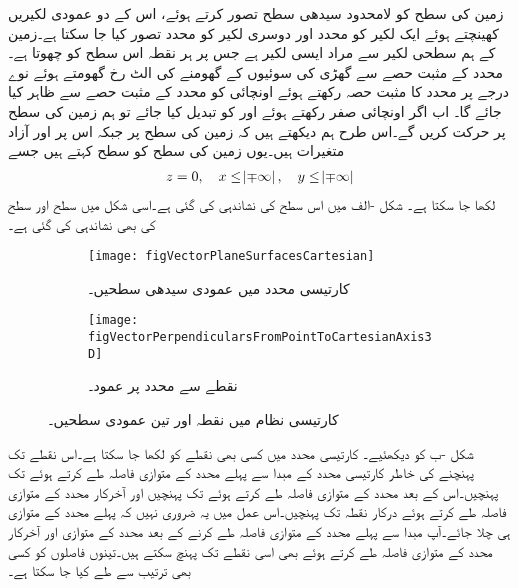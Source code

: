 زمین کی سطح کو لامحدود سیدھی سطح تصور کرتے ہوئے،  اس کے  دو عمودی لکیریں کھینچتے ہوئے ایک لکیر کو  محدد اور دوسری لکیر کو  محدد تصور کیا جا سکتا ہے۔زمین کے ہم سطحی لکیر سے مراد ایسی لکیر ہے جس پر ہر نقطہ اس سطح کو چھوتا ہے۔ محدد کے مثبت حصے  سے گھڑی کی سوئیوں کے گھومنے کی الٹ رخ گھومتے ہوئے نوے درجے پر  محدد کا مثبت حصہ رکھتے ہوئے اونچائی کو  محدد کے مثبت حصے  سے ظاہر کیا جائے گا۔ اب اگر اونچائی صفر رکھتے ہوئے  اور  کو تبدیل کیا جائے تو ہم زمین کی سطح پر حرکت کریں گے۔اس طرح ہم دیکھتے ہیں کہ زمین کی سطح پر  جبکہ اس پر  اور  آزاد متغیرات ہیں۔یوں زمین کی سطح کو  سطح کہتے ہیں جسے
\begin{align*}
z=0, \quad  x\le \abs{\mp \infty}, \quad y \le \abs{\mp \infty}
\end{align*} 
لکھا جا سکتا ہے۔  شکل -الف میں اس سطح کی نشاندہی کی گئی ہے۔اسی شکل میں  سطح اور  سطح کی بھی نشاندہی کی گئی ہے۔

\begin{figure}
\centering
\begin{subfigure}{0.5\textwidth}
\centering
\texttt{[image: figVectorPlaneSurfacesCartesian]}
\caption{کارتیسی محدد میں عمودی سیدھی سطحیں۔}
\label{شکل_سمتیہ_کارتیسی_عمودی-تین_سطحیں}
\end{subfigure}%
%
\begin{subfigure}{0.5\textwidth}
\centering
\texttt{[image: figVectorPerpendicularsFromPointToCartesianAxis3D]}
\caption{نقطے سے محدد پر عمود۔}
\label{شکل_سمتیہ_نقطے_سے_کارتیسی_محدد_پر_عمود}
\end{subfigure}%
\caption{کارتیسی نظام میں نقطہ اور تین عمودی سطحیں۔}
\label{شکل_سمتیہ_کارتیسی_نقطہ_اور_عمودی_سطحیں}
\end{figure}
شکل  -ب  کو دیکھئیے۔ کارتیسی محدد میں کسی بھی نقطے کو  لکھا جا سکتا ہے۔اس نقطے تک پہنچنے کی خاطر  کارتیسی محدد کے مبدا سے پہلے  محدد کے متوازی   فاصلہ طے کرتے ہوئے  تک پہنچیں۔اس کے بعد  محدد کے متوازی  فاصلہ طے کرتے ہوئے  تک پہنچیں  اور آخرکار  محدد کے متوازی  فاصلہ طے کرتے ہوئے درکار نقطہ  تک پہنچیں۔اس عمل میں یہ ضروری نہیں کہ پہلے  محدد کے متوازی ہی چلا جائے۔آپ مبدا سے پہلے  محدد کے متوازی  فاصلہ طے کرنے کے بعد  محدد کے متوازی  اور آخرکار  محدد کے متوازی  فاصلہ طے کرتے ہوئے بھی اسی نقطے تک پہنچ سکتے ہیں۔تینوں فاصلوں کو کسی بھی ترتیب سے طے کیا جا سکتا ہے۔

